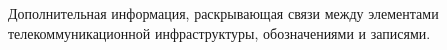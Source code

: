 Дополнительная информация, раскрывающая связи между 
элементами телекоммуникационной инфраструктуры,
обозначениями и записями.